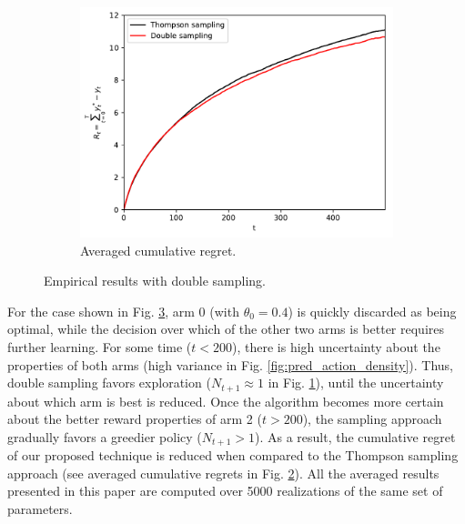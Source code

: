\documentclass{article}
\begin{document}
\begin{figure}[!h]
\begin{subfigure}[b]{0.33\textwidth}
		\label{fig:n_samples}
	\end{subfigure}
	\begin{subfigure}[b]{0.33\textwidth}
		\includegraphics[width=\textwidth]{./figs/bernoulli/cumulative_regret.pdf}
		\caption{Averaged cumulative regret.}
		\label{fig:cumulative_regret}
	\end{subfigure}
	\caption{Empirical results with double sampling.}
	\label{fig:approach_intuition}
\end{figure}

For the case shown in Fig. \ref{fig:approach_intuition}, arm 0 (with $\theta_0=0.4$) is quickly discarded as being optimal, while the decision over which of the other two arms is better requires further learning. For some time ($t<200$), there is high uncertainty about the properties of both arms (high variance in Fig. \ref{fig:pred_action_density}). Thus, double sampling favors exploration ($N_{t+1}\approx 1$ in Fig. \ref{fig:n_samples}), until the uncertainty about which arm is best is reduced. Once the algorithm becomes more certain about the better reward properties of arm 2 ($t>200$), the sampling approach gradually favors a greedier policy ($N_{t+1}>1$). As a result, the cumulative regret of our proposed technique is reduced when compared to the Thompson sampling approach (see averaged cumulative regrets in Fig. \ref{fig:cumulative_regret}). All the averaged results presented in this paper are computed over 5000 realizations of the same set of parameters.
\end{document}
